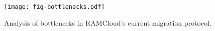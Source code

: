 \begin{figure}[H]
\texttt{[image: fig-bottlenecks.pdf]}
\caption{Analysis of bottlenecks in RAMCloud's current migration protocol.}
\label{fig:bottlenecks}
\end{figure}
